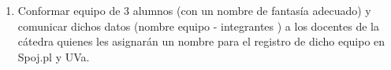 \begin{enumerate}[1 -]
	\item  Conformar equipo de 3 alumnos (con un nombre de fantasía adecuado) y comunicar dichos datos (nombre equipo - integrantes ) a los docentes de la cátedra quienes les asignarán un nombre para el registro de dicho equipo en Spoj.pl y UVa.

\end{enumerate}






